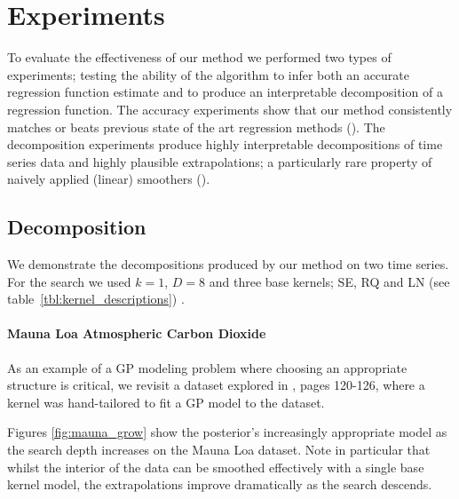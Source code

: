 \documentclass[twoside]{article}
\begin{document}

\section{Experiments}

To evaluate the effectiveness of our method we performed two types of experiments; testing the ability of the algorithm to infer both an accurate regression function estimate and to produce an interpretable decomposition of a regression function.
The accuracy experiments show that our method consistently matches or beats previous state of the art regression methods ().
The decomposition experiments produce highly interpretable decompositions of time series data and highly plausible extrapolations; a particularly rare property of naively applied (linear) smoothers ().

\subsection{Decomposition}

We demonstrate the decompositions produced by our method on two time series.
For the search we used $k = 1$, $D = 8$ and three base kernels; SE, RQ and LN (see table~\ref{tbl:kernel_descriptions}) .



\paragraph{Mauna Loa Atmospheric Carbon Dioxide}

As an example of a GP modeling problem where choosing an appropriate structure is critical, we revisit a dataset explored in \cite{rasmussen38gaussian}, pages 120-126, where a kernel was hand-tailored to fit a GP model to the dataset.

Figures \ref{fig:mauna_grow} show the posterior's increasingly appropriate model as the search depth increases on the Mauna Loa dataset.
Note in particular that whilst the interior of the data can be smoothed effectively with a single base kernel model, the extrapolations improve dramatically as the search descends.
\end{document}
